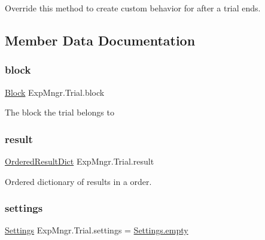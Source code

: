 Override this method to create custom behavior for after a trial ends. 



\subsection{Member Data Documentation}
\mbox{\label{class_exp_mngr_1_1_trial_ab1e65f76d97081ae962fe22637a32bad}} 
\subsubsection{\texorpdfstring{block}{block}}
{\footnotesize\ttfamily \hyperlink{class_exp_mngr_1_1_block}{Block} Exp\+Mngr.\+Trial.\+block}



The block the trial belongs to 

\mbox{\label{class_exp_mngr_1_1_trial_aecde0037b2ddec7c09c6b4f2a6c12263}} 
\subsubsection{\texorpdfstring{result}{result}}
{\footnotesize\ttfamily \hyperlink{class_ordered_result_dict}{Ordered\+Result\+Dict} Exp\+Mngr.\+Trial.\+result}



Ordered dictionary of results in a order. 

\mbox{\label{class_exp_mngr_1_1_trial_a6f92b03ff55c788613c0bd44e1190449}} 
\subsubsection{\texorpdfstring{settings}{settings}}
{\footnotesize\ttfamily \hyperlink{class_exp_mngr_1_1_settings}{Settings} Exp\+Mngr.\+Trial.\+settings = \hyperlink{class_exp_mngr_1_1_settings_a9a79c93bbbd6158a6ae543a615da6e6a}{Settings.\+empty}}



